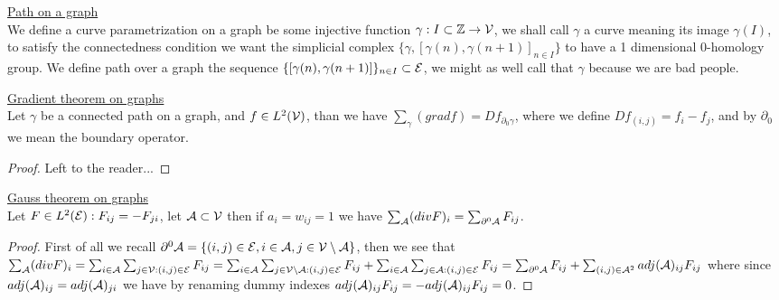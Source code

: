 \documentclass[../main.tex]{subfiles}
\begin{document}
\begin{defn}
    \underline{Path on a graph}\\
    We define a curve parametrization on a graph be some injective function $ \gamma : I \subset \mathbb{Z} \to \mathcal{V}$, we shall call $\gamma$ 
    a curve meaning its image $\gamma(I)$, to satisfy the connectedness condition we want the simplicial complex $\{ \gamma,[\gamma(n),\gamma(n+1)]_{n \in I} \}$
    to have a 1 dimensional 0-homology group. We define path over a graph the sequence $\{ [\gamma(n),\gamma(n+1)] \}_{n \in I} \subset \mathcal{E}$, we
    might as well call that $\gamma$ because we are bad people.
\end{defn}

\begin{thm}
    \underline{Gradient theorem on graphs}\\
    Let $\gamma$ be a connected path on a graph, and $f \in L^2(\mathcal{V})$, than we have $\sum_\gamma (gradf) = Df_{\partial_0 \gamma}$,
    where we define $Df_{(i,j)} = f_i - f_j$, and by $\partial_0$ we mean the boundary operator.
\end{thm}
\begin{proof}
    Left to the reader...
\end{proof}


\begin{thm}
    \underline{Gauss theorem on graphs}\\
    Let $F \in L^2(\mathcal{E}) : F_{ij}=-F_{ji}$, let $\mathcal{A} \subset \mathcal{V}$ then if $a_i = w_{ij} = 1$ we have
    $\sum_{\mathcal{A}} (divF)_i = \sum_{\partial^0 \mathcal{A}} F_{ij}$.
\end{thm}
\begin{proof}
    First of all we recall $\partial^0 \mathcal{A} = \{ (i,j) \in \mathcal{E}, i \in \mathcal{A}, j \in \mathcal{V \setminus A} \}$, then we see that
    $\sum_{\mathcal{A}} (divF)_i = \sum_{i \in \mathcal{A}}\sum_{j \in \mathcal{V} : (i,j) \in \mathcal{E}} F_{ij} =
    \sum_{i \in \mathcal{A}}\sum_{j \in \mathcal{V \setminus A} : (i,j) \in \mathcal{E}} F_{ij} +
    \sum_{i \in \mathcal{A}}\sum_{j \in \mathcal{A} : (i,j) \in \mathcal{E}} F_{ij} = \sum_{\partial^0 \mathcal{A}} F_{ij} + \sum_{(i,j) \in \mathcal{A}^2} adj(\mathcal{A})_{ij} F_{ij}$
    where since $adj(\mathcal{A})_{ij} = adj(\mathcal{A})_{ji}$ we have by renaming dummy indexes $adj(\mathcal{A})_{ij} F_{ij} = -adj(\mathcal{A})_{ij} F_{ij} = 0$.
\end{proof}
\end{document}
